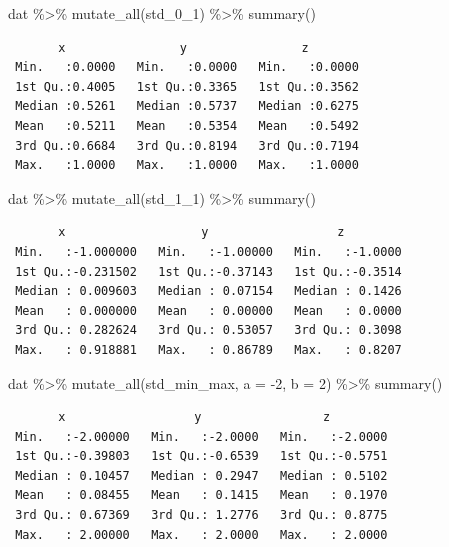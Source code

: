\documentclass[
  letterpaper,
  DIV=11,
  numbers=noendperiod]{scrreprt}
\newenvironment{Shaded}{\begin{snugshade}}{\end{snugshade}}
\newcommand{\AttributeTok}[1]{\textcolor[rgb]{0.40,0.45,0.13}{#1}}
\newcommand{\DecValTok}[1]{\textcolor[rgb]{0.68,0.00,0.00}{#1}}
\newcommand{\FunctionTok}[1]{\textcolor[rgb]{0.28,0.35,0.67}{#1}}
\newcommand{\NormalTok}[1]{\textcolor[rgb]{0.00,0.23,0.31}{#1}}
\newcommand{\SpecialCharTok}[1]{\textcolor[rgb]{0.37,0.37,0.37}{#1}}
\begin{document}
\begin{Shaded}
\begin{Highlighting}[]
\NormalTok{dat }\SpecialCharTok{\%\textgreater{}\%} \FunctionTok{mutate\_all}\NormalTok{(std\_0\_1) }\SpecialCharTok{\%\textgreater{}\%} \FunctionTok{summary}\NormalTok{()}
\end{Highlighting}
\end{Shaded}

\begin{verbatim}
       x                y                z         
 Min.   :0.0000   Min.   :0.0000   Min.   :0.0000  
 1st Qu.:0.4005   1st Qu.:0.3365   1st Qu.:0.3562  
 Median :0.5261   Median :0.5737   Median :0.6275  
 Mean   :0.5211   Mean   :0.5354   Mean   :0.5492  
 3rd Qu.:0.6684   3rd Qu.:0.8194   3rd Qu.:0.7194  
 Max.   :1.0000   Max.   :1.0000   Max.   :1.0000  
\end{verbatim}

\begin{Shaded}
\begin{Highlighting}[]
\NormalTok{dat }\SpecialCharTok{\%\textgreater{}\%} \FunctionTok{mutate\_all}\NormalTok{(std\_1\_1) }\SpecialCharTok{\%\textgreater{}\%} \FunctionTok{summary}\NormalTok{()}
\end{Highlighting}
\end{Shaded}

\begin{verbatim}
       x                   y                  z          
 Min.   :-1.000000   Min.   :-1.00000   Min.   :-1.0000  
 1st Qu.:-0.231502   1st Qu.:-0.37143   1st Qu.:-0.3514  
 Median : 0.009603   Median : 0.07154   Median : 0.1426  
 Mean   : 0.000000   Mean   : 0.00000   Mean   : 0.0000  
 3rd Qu.: 0.282624   3rd Qu.: 0.53057   3rd Qu.: 0.3098  
 Max.   : 0.918881   Max.   : 0.86789   Max.   : 0.8207  
\end{verbatim}

\begin{Shaded}
\begin{Highlighting}[]
\NormalTok{dat }\SpecialCharTok{\%\textgreater{}\%} \FunctionTok{mutate\_all}\NormalTok{(std\_min\_max, }\AttributeTok{a =} \SpecialCharTok{{-}}\DecValTok{2}\NormalTok{, }\AttributeTok{b =} \DecValTok{2}\NormalTok{) }\SpecialCharTok{\%\textgreater{}\%} \FunctionTok{summary}\NormalTok{()}
\end{Highlighting}
\end{Shaded}

\begin{verbatim}
       x                  y                 z          
 Min.   :-2.00000   Min.   :-2.0000   Min.   :-2.0000  
 1st Qu.:-0.39803   1st Qu.:-0.6539   1st Qu.:-0.5751  
 Median : 0.10457   Median : 0.2947   Median : 0.5102  
 Mean   : 0.08455   Mean   : 0.1415   Mean   : 0.1970  
 3rd Qu.: 0.67369   3rd Qu.: 1.2776   3rd Qu.: 0.8775  
 Max.   : 2.00000   Max.   : 2.0000   Max.   : 2.0000  
\end{verbatim}
\end{document}
